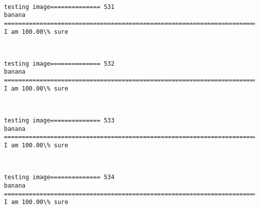 \documentclass[11pt]{article}
\begin{document}
    \begin{center}
    \end{center}
    { \hspace*{\fill} \\}
    
    \begin{Verbatim}[commandchars=\\\{\}]
testing image============== 531
banana
============================================================================
I am 100.00\% sure

    \end{Verbatim}

    \begin{center}
    \end{center}
    { \hspace*{\fill} \\}
    
    \begin{Verbatim}[commandchars=\\\{\}]
testing image============== 532
banana
============================================================================
I am 100.00\% sure

    \end{Verbatim}

    \begin{center}
    \end{center}
    { \hspace*{\fill} \\}
    
    \begin{Verbatim}[commandchars=\\\{\}]
testing image============== 533
banana
============================================================================
I am 100.00\% sure

    \end{Verbatim}

    \begin{center}
    \end{center}
    { \hspace*{\fill} \\}
    
    \begin{Verbatim}[commandchars=\\\{\}]
testing image============== 534
banana
============================================================================
I am 100.00\% sure

    \end{Verbatim}
\end{document}
